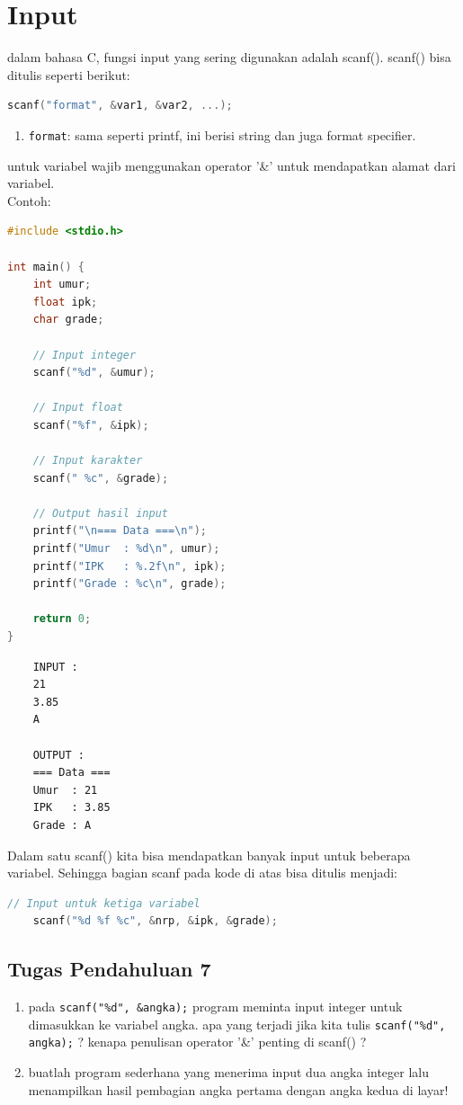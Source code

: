 \section{Input}

dalam bahasa C, fungsi input yang sering digunakan adalah scanf().
scanf() bisa ditulis seperti berikut:
{
\captionsetup[lstlisting]{labelformat=empty, justification=raggedright, singlelinecheck=false} %
\begin{lstlisting}[language=c, caption={syntax}]
	scanf("format", &var1, &var2, ...);
\end{lstlisting}
}
\begin{enumerate}[label={}, leftmargin=*]
	\item \verb|format|: sama seperti printf, ini berisi string dan juga format specifier.
\end{enumerate}
untuk variabel wajib menggunakan operator '\&' untuk mendapatkan alamat dari variabel.
\\ Contoh:
\begin{lstlisting}[language=c]
#include <stdio.h>

int main() {
	int umur;
	float ipk;
	char grade;

	// Input integer
	scanf("%d", &umur);

	// Input float
	scanf("%f", &ipk);

	// Input karakter
	scanf(" %c", &grade);

	// Output hasil input
	printf("\n=== Data ===\n");
	printf("Umur  : %d\n", umur);
	printf("IPK   : %.2f\n", ipk);
	printf("Grade : %c\n", grade);

	return 0;
}
\end{lstlisting}
\begin{verbatim}
	INPUT :
	21
	3.85
	A

	OUTPUT :
	=== Data ===
	Umur  : 21
	IPK   : 3.85
	Grade : A
\end{verbatim}
Dalam satu scanf() kita bisa mendapatkan banyak input untuk beberapa variabel.
Sehingga bagian scanf pada kode di atas bisa ditulis menjadi:
\begin{lstlisting}[language=c]
	// Input untuk ketiga variabel
	scanf("%d %f %c", &nrp, &ipk, &grade);
\end{lstlisting}

\subsection*{Tugas Pendahuluan 7}
\begin{enumerate}
	\item pada \verb|scanf("%d", &angka);| program meminta input integer untuk dimasukkan ke variabel angka.
     apa yang terjadi jika kita tulis \verb|scanf("%d", angka);| ? kenapa penulisan operator '\&' penting di scanf() ?
  	\item buatlah program sederhana yang menerima input dua angka integer lalu menampilkan hasil pembagian angka pertama dengan angka kedua di layar!
\end{enumerate}


